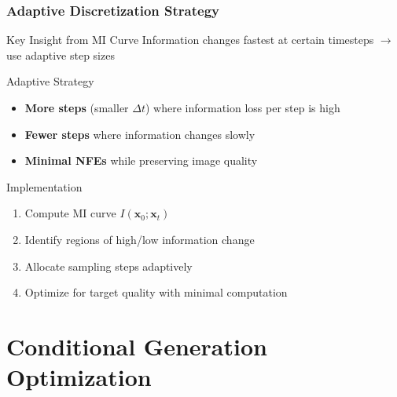 \documentclass[aspectratio=169]{beamer}
\begin{document}
\begin{frame}
\frametitle{Adaptive Discretization Strategy}
\begin{block}{Key Insight from MI Curve}
Information changes fastest at certain timesteps $\rightarrow$ use adaptive step sizes
\end{block}

\begin{block}{Adaptive Strategy}
\begin{itemize}
\item \textbf{More steps} (smaller $\Delta t$) where information loss per step is high
\item \textbf{Fewer steps} where information changes slowly
\item \textbf{Minimal NFEs} while preserving image quality
\end{itemize}
\end{block}

\begin{block}{Implementation}
\begin{enumerate}
\item Compute MI curve $I(\mathbf{x}_0;\mathbf{x}_t)$
\item Identify regions of high/low information change
\item Allocate sampling steps adaptively
\item Optimize for target quality with minimal computation
\end{enumerate}
\end{block}
\end{frame}

\section{Conditional Generation Optimization}
\end{document}
